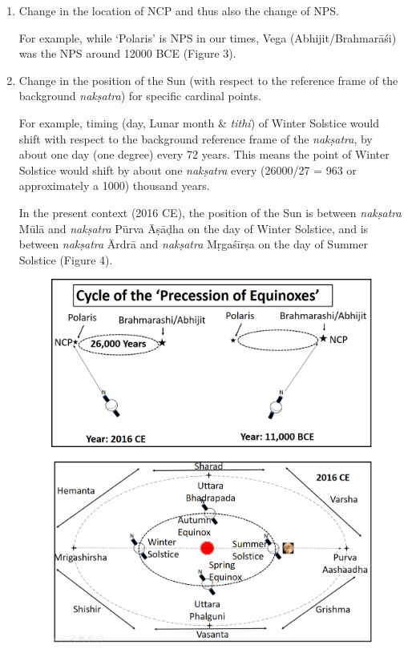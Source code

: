 \begin{enumerate}
\itemsep=0pt
\item 
 Change in the location of NCP and thus also the change of NPS.

 For example, while ‘Polaris’ is NPS in our times, Vega (Abhijit/Brahmarāśi) was the NPS around 12000 BCE (Figure 3).

 \item 
 Change in the position of the Sun (with respect to the reference frame of the background \textit{nakṣatra}) for specific cardinal points.

 For example, timing (day, Lunar month \& \textit{tithi}) of Winter Solstice would shift with respect to the background reference frame of the \textit{nakṣatra}, by about one day (one degree) every 72 years. This means the point of Winter Solstice would shift by about one \textit{nakṣatra} every (26000/27 = 963 or approximately a 1000) thousand years.

 In the present context (2016 CE), the position of the Sun is between \textit{nakṣatra} Mūlā and \textit{nakṣatra} Pūrva Āṣāḍha on the day of Winter Solstice, and is between \textit{nakṣatra} Ārdrā and \textit{nakṣatra} Mṛgaśīrṣa on the day of Summer Solstice (Figure 4).


\begin{figure}[!h]
\includegraphics[scale=.17]{images/chap2-4.jpg}
\caption{}\label{chap1-fig3}
\end{figure}


\begin{figure}[!h]
\includegraphics[scale=.165]{images/chap2-5.jpg}
\caption{}\label{chap1-fig4}
\end{figure}


\end{enumerate}
